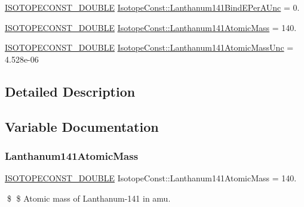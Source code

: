 \begin{DoxyCompactItemize}
\mbox{\hyperlink{group___isotope_const-_macros_ga8f45a7272ce02c0b4c65c44636ed719a}{I\+S\+O\+T\+O\+P\+E\+C\+O\+N\+S\+T\+\_\+\+D\+O\+U\+B\+LE}} \mbox{\hyperlink{group___isotope_const-_lanthanum-_la141_gaee664d4708e322cf15b2d33ac7f8f72b}{Isotope\+Const\+::\+Lanthanum141\+Bind\+E\+Per\+A\+Unc}} = 0.
\item 
\mbox{\hyperlink{group___isotope_const-_macros_ga8f45a7272ce02c0b4c65c44636ed719a}{I\+S\+O\+T\+O\+P\+E\+C\+O\+N\+S\+T\+\_\+\+D\+O\+U\+B\+LE}} \mbox{\hyperlink{group___isotope_const-_lanthanum-_la141_gaaaa51e44731c34cd66b9a45f15511ef9}{Isotope\+Const\+::\+Lanthanum141\+Atomic\+Mass}} = 140.
\item 
\mbox{\hyperlink{group___isotope_const-_macros_ga8f45a7272ce02c0b4c65c44636ed719a}{I\+S\+O\+T\+O\+P\+E\+C\+O\+N\+S\+T\+\_\+\+D\+O\+U\+B\+LE}} \mbox{\hyperlink{group___isotope_const-_lanthanum-_la141_gaa72e863cba6030c46b007092a5c4c7fc}{Isotope\+Const\+::\+Lanthanum141\+Atomic\+Mass\+Unc}} = 4.\+528e-\/06
\end{DoxyCompactItemize}


\subsection{Detailed Description}


\subsection{Variable Documentation}
\mbox{\label{group___isotope_const-_lanthanum-_la141_gaaaa51e44731c34cd66b9a45f15511ef9}} 
\subsubsection{\texorpdfstring{Lanthanum141\+Atomic\+Mass}{Lanthanum141AtomicMass}}
{\footnotesize\ttfamily \mbox{\hyperlink{group___isotope_const-_macros_ga8f45a7272ce02c0b4c65c44636ed719a}{I\+S\+O\+T\+O\+P\+E\+C\+O\+N\+S\+T\+\_\+\+D\+O\+U\+B\+LE}} Isotope\+Const\+::\+Lanthanum141\+Atomic\+Mass = 140.}

\$ \$ Atomic mass of Lanthanum-\/141 in amu. \mbox{\label{group___isotope_const-_lanthanum-_la141_gaa72e863cba6030c46b007092a5c4c7fc}} 
